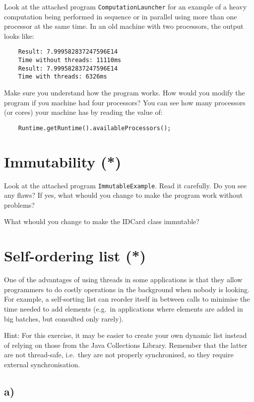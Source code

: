 \documentclass{article}
\begin{document}
Look at the attached program \verb+ComputationLauncher+ for an example
of a heavy computation being performed in sequence or in parallel
using more than one processor at the same time. In an old machine with
two processors, the output looks like: 

\begin{verbatim}
    Result: 7.999582837247596E14
    Time without threads: 11110ms
    Result: 7.999582837247596E14
    Time with threads: 6326ms
\end{verbatim}

Make sure you understand how the program works. How would you modify
the program if you machine had four processors? You can see how many
processors (or cores) your machine has by reading the value of: 

\begin{verbatim}
    Runtime.getRuntime().availableProcessors();
\end{verbatim}

\section{Immutability (*)}
\label{sec:immutability}

Look at the attached program \verb+ImmutableExample+. Read it
carefully. Do you see any flaws? If yes, what whould you change to
make the program work without problems?

What whould you change to make the IDCard class immutable?

\section{Self-ordering list (*)}
\label{sec:self-ordering-list}

One of the advantages of using threads in some applications is that
they allow programmers to do costly operations in the background when
nobody is looking. For example, a self-sorting list can reorder itself
in between calls to minimise the time needed to add elements (e.g.~in
applications where elements are added in big batches, but consulted
only rarely).

Hint: For this exercise, it may be easier to create your own dynamic
list instead of relying on those from the Java Collections
Library. Remember that the latter are not thread-safe, i.e.~they are
not properly synchronised, so they require external synchronisation. 

\subsection{a)}
\end{document}
